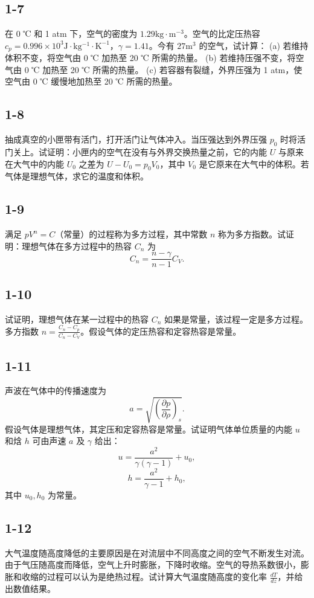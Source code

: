\newpage
\subsection{1-7}
在 0 ℃ 和 1 atm 下，空气的密度为 $1.29 \mathrm{kg \cdot m^{-3}}$。空气的比定压热容 $c_p = 0.996 \times 10^3 \mathrm{J \cdot kg^{-1} \cdot K^{-1}}$，$\gamma = 1.41$。今有 $27 \mathrm{m^3}$ 的空气，试计算：
(a) 若维持体积不变，将空气由 0 ℃ 加热至 20 ℃ 所需的热量。
(b) 若维持压强不变，将空气由 0 ℃ 加热至 20 ℃ 所需的热量。
(c) 若容器有裂缝，外界压强为 1 atm，使空气由 0 ℃ 缓慢地加热至 20 ℃ 所需的热量。

\newpage
\subsection{1-8}
抽成真空的小匣带有活门，打开活门让气体冲入。当压强达到外界压强 $p_0$ 时将活门关上。试证明：小匣内的空气在没有与外界交换热量之前，它的内能 $U$ 与原来在大气中的内能 $U_0$ 之差为 $U - U_0 = p_0 V_0$，其中 $V_0$ 是它原来在大气中的体积。若气体是理想气体，求它的温度和体积。

\newpage
\subsection{1-9}
满足 $pV^n = C$（常量）的过程称为多方过程，其中常数 $n$ 称为多方指数。试证明：理想气体在多方过程中的热容 $C_n$ 为
$$C_n = \frac{n-\gamma}{n-1}C_V.$$

\newpage
\subsection{1-10}
试证明，理想气体在某一过程中的热容 $C_n$ 如果是常量，该过程一定是多方过程。多方指数 $n=\frac{C_n-C_p}{C_n-C_V}$。假设气体的定压热容和定容热容是常量。

\newpage
\subsection{1-11}
声波在气体中的传播速度为
$$a = \sqrt{\left( \frac{\partial p}{\partial \rho} \right)_s}.$$
假设气体是理想气体，其定压和定容热容是常量。试证明气体单位质量的内能 $u$ 和焓 $h$ 可由声速 $a$ 及 $\gamma$ 给出：
$$u = \frac{a^2}{\gamma(\gamma - 1)} + u_0,$$
$$h = \frac{a^2}{\gamma - 1} + h_0,$$
其中 $u_0, h_0$ 为常量。

\newpage
\subsection{1-12}
大气温度随高度降低的主要原因是在对流层中不同高度之间的空气不断发生对流。由于气压随高度而降低，空气上升时膨胀，下降时收缩。空气的导热系数很小，膨胀和收缩的过程可以认为是绝热过程。试计算大气温度随高度的变化率 $\frac{dT}{dz}$，并给出数值结果。

